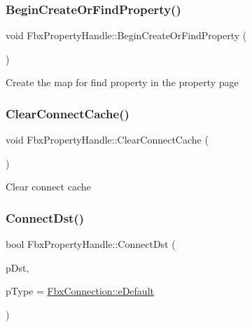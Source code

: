 \subsubsection{\texorpdfstring{Begin\+Create\+Or\+Find\+Property()}{BeginCreateOrFindProperty()}}
{\footnotesize\ttfamily void Fbx\+Property\+Handle\+::\+Begin\+Create\+Or\+Find\+Property (\begin{DoxyParamCaption}{ }\end{DoxyParamCaption})}



Create the map for find property in the property page 

\mbox{\label{class_fbx_property_handle_a7c7d33409675381ba019ac3a2d67c372}} 
\subsubsection{\texorpdfstring{Clear\+Connect\+Cache()}{ClearConnectCache()}}
{\footnotesize\ttfamily void Fbx\+Property\+Handle\+::\+Clear\+Connect\+Cache (\begin{DoxyParamCaption}{ }\end{DoxyParamCaption})}



Clear connect cache 

\mbox{\label{class_fbx_property_handle_aae1fece6b331a3d0550df3258a89ac82}} 
\subsubsection{\texorpdfstring{Connect\+Dst()}{ConnectDst()}}
{\footnotesize\ttfamily bool Fbx\+Property\+Handle\+::\+Connect\+Dst (\begin{DoxyParamCaption}\item[{const \hyperlink{class_fbx_property_handle}{Fbx\+Property\+Handle} \&}]{p\+Dst,  }\item[{const \hyperlink{class_fbx_connection_a3df448a5db356652ab99fd2be2553749}{Fbx\+Connection\+::\+E\+Type}}]{p\+Type = {\ttfamily \hyperlink{class_fbx_connection_a3df448a5db356652ab99fd2be2553749a93ca385d7cc25fef28232a2d10b836e3}{Fbx\+Connection\+::e\+Default}} }\end{DoxyParamCaption})}

